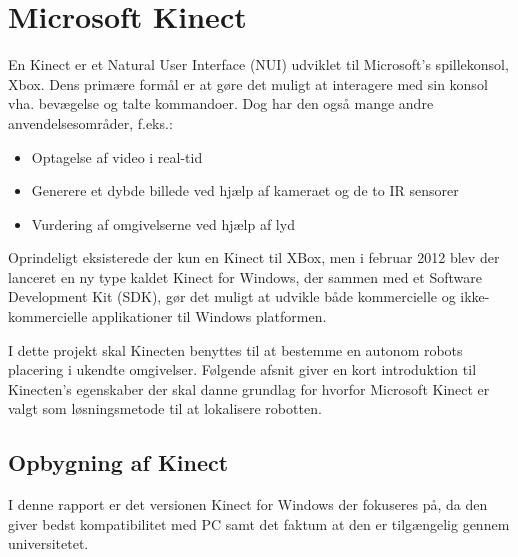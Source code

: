  \section{Microsoft Kinect}\label{kinect}
En Kinect er et Natural User Interface (NUI) udviklet til Microsoft's spillekonsol, Xbox.
Dens primære formål er at gøre det muligt at interagere med sin konsol vha. bevægelse og talte kommandoer.
Dog har den også mange andre anvendelsesområder, f.eks.:
%

\begin{itemize}
\item Optagelse af video i real-tid
\item Generere et dybde billede ved hjælp af kameraet og de to IR sensorer
\item Vurdering af omgivelserne ved hjælp af lyd
\end{itemize}

Oprindeligt eksisterede der kun en Kinect til XBox, men i februar 2012 blev der lanceret en ny type kaldet Kinect for Windows, der sammen med et Software Development Kit (SDK), gør det muligt at udvikle både kommercielle og ikke-kommercielle applikationer til Windows platformen.

I dette projekt skal Kinecten benyttes til at bestemme en autonom robots placering i ukendte omgivelser. 
Følgende afsnit giver en kort introduktion til Kinecten's egenskaber der skal danne grundlag for hvorfor Microsoft Kinect er valgt som løsningsmetode til at lokalisere robotten.\cite{kinectProgrammingGuide}

\subsection{Opbygning af Kinect}\label{kinect:komponenter}
I denne rapport er det versionen Kinect for Windows der fokuseres på, da den giver bedst kompatibilitet med PC samt det faktum at den er tilgængelig gennem universitetet.

